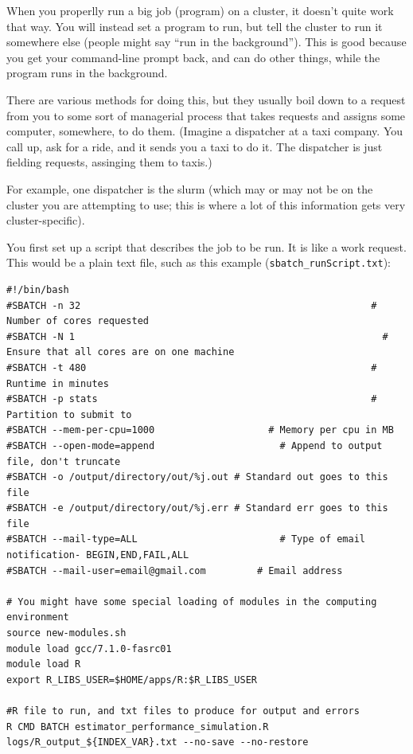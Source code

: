 \documentclass[
]{book}
\begin{document}
When you properlly run a big job (program) on a cluster, it doesn't quite work that way.
You will instead set a program to run, but tell the cluster to run it somewhere else (people might say ``run in the background'').
This is good because you get your command-line prompt back, and can do other things, while the program runs in the background.

There are various methods for doing this, but they usually boil down to a request from you to some sort of managerial process that takes requests and assigns some computer, somewhere, to do them.
(Imagine a dispatcher at a taxi company. You call up, ask for a ride, and it sends you a taxi to do it. The dispatcher is just fielding requests, assinging them to taxis.)

For example, one dispatcher is the slurm (which may or may not be on the cluster you are attempting to use; this is where a lot of this information gets very cluster-specific).

You first set up a script that describes the job to be run.
It is like a work request.
This would be a plain text file, such as this example (\texttt{sbatch\_runScript.txt}):

\begin{verbatim}
#!/bin/bash
#SBATCH -n 32                                                   # Number of cores requested
#SBATCH -N 1                                                      # Ensure that all cores are on one machine
#SBATCH -t 480                                                  # Runtime in minutes
#SBATCH -p stats                                                # Partition to submit to
#SBATCH --mem-per-cpu=1000                    # Memory per cpu in MB
#SBATCH --open-mode=append                      # Append to output file, don't truncate
#SBATCH -o /output/directory/out/%j.out # Standard out goes to this file
#SBATCH -e /output/directory/out/%j.err # Standard err goes to this file
#SBATCH --mail-type=ALL                         # Type of email notification- BEGIN,END,FAIL,ALL
#SBATCH --mail-user=email@gmail.com         # Email address

# You might have some special loading of modules in the computing environment
source new-modules.sh
module load gcc/7.1.0-fasrc01
module load R
export R_LIBS_USER=$HOME/apps/R:$R_LIBS_USER

#R file to run, and txt files to produce for output and errors
R CMD BATCH estimator_performance_simulation.R logs/R_output_${INDEX_VAR}.txt --no-save --no-restore
\end{verbatim}
\end{document}
